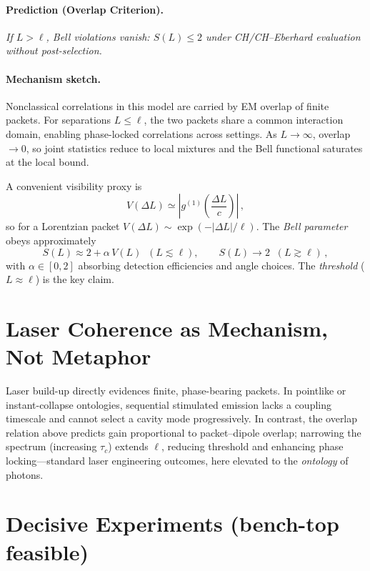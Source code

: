 \documentclass[reprint,aps,prl,nofootinbib,superscriptaddress]{revtex4-2}
\begin{document}
\paragraph*{Prediction (Overlap Criterion).}
\emph{If $L>\ell$, Bell violations vanish: $S(L) \le 2$ under CH/CH--Eberhard evaluation without post-selection.}

\paragraph*{Mechanism sketch.}
Nonclassical correlations in this model are carried by EM overlap of finite packets. For separations $L \le \ell$, the two packets share a common interaction domain, enabling phase-locked correlations across settings. As $L \to \infty$, overlap $\to 0$, so joint statistics reduce to local mixtures and the Bell functional saturates at the local bound.

A convenient visibility proxy is
\begin{equation}
V(\Delta L) \simeq \left| g^{(1)}\!\left(\frac{\Delta L}{c}\right) \right|\,,
\end{equation}
so for a Lorentzian packet $V(\Delta L) \sim \exp(-|\Delta L|/\ell)$. The \emph{Bell parameter} obeys approximately
\begin{equation}
S(L) \approx 2 + \alpha\,V(L) \;\; (L \lesssim \ell), \qquad S(L) \to 2 \;\; (L \gtrsim \ell)\,,
\end{equation}
with $\alpha \in [0,2]$ absorbing detection efficiencies and angle choices. The \emph{threshold} ($L \approx \ell$) is the key claim.

\section{Laser Coherence as Mechanism, Not Metaphor}
Laser build-up directly evidences finite, phase-bearing packets. In pointlike or instant-collapse ontologies, sequential stimulated emission lacks a coupling timescale and cannot select a cavity mode progressively. In contrast, the overlap relation above predicts gain proportional to packet--dipole overlap; narrowing the spectrum (increasing $\tau_c$) extends $\ell$, reducing threshold and enhancing phase locking---standard laser engineering outcomes, here elevated to the \emph{ontology} of photons.

\section{Decisive Experiments (bench-top feasible)}
\end{document}
